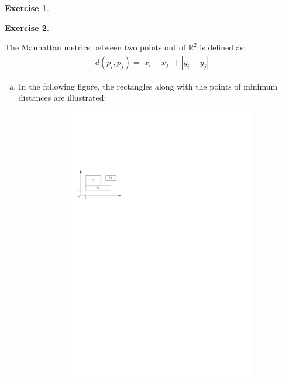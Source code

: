 \documentclass[a4paper,12pt,headsepline]{scrartcl}
\newtheorem{aufgabe}{Exercise}
\begin{document}
\begin{aufgabe}
\end{aufgabe}

\newpage
\begin{aufgabe}
\end{aufgabe}
The Manhattan metrics between two points out of $\mathbb{R}^2$ is defined as:
\begin{align*}
d(p_i,p_j) = |x_i - x_j| + |y_i - y_j|
\end{align*}
\begin{enumerate}[a)]
	\item In the following figure, the rectangles along with the points of minimum distances are illustrated:
	\begin{figure}[H]
		\centering
		\begin{subfigure}{0.48\textwidth}
			\centering
			\includegraphics[width=1\linewidth,page=1]{graphics/7_2.pdf}

\end{subfigure}
\end{figure}
\end{enumerate}
\end{document}
